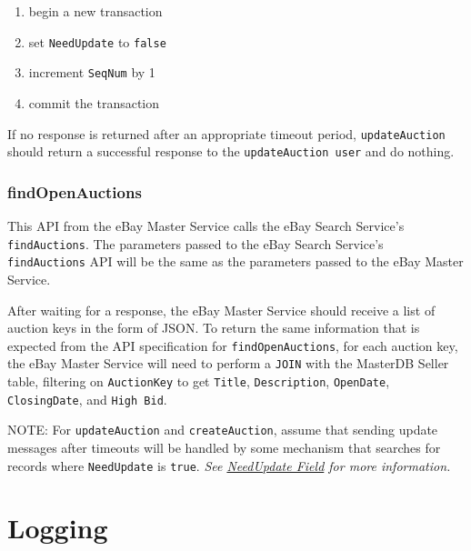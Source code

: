 \documentclass[12pt,a4paper]{article}
\begin{document}
 \begin{enumerate}
     \item begin a new transaction
     \item set \texttt{NeedUpdate} to \texttt{false}
     \item increment \texttt{SeqNum} by 1
     \item commit the transaction
 \end{enumerate}


 If no response is returned after an appropriate timeout period, \texttt{updateAuction} 
 should return a successful response to the \texttt{updateAuction user} and do nothing.

 
\subsubsection{findOpenAuctions}
This API from the eBay Master Service calls the eBay Search Service's \texttt{findAuctions}.
The parameters passed to the eBay Search Service's \texttt{findAuctions} API will be the same
as the parameters passed to the eBay Master Service.
\vspace{\baselineskip}

After waiting for a response, the eBay Master Service should receive a list of auction keys 
in the form of JSON.  To return the same information that is expected from the API specification 
for \texttt{findOpenAuctions}, for each auction key, the eBay Master Service will need to perform a 
\texttt{JOIN} with the MasterDB Seller table, filtering on \texttt{AuctionKey} to get \texttt{Title}, 
\texttt{Description}, \texttt{OpenDate}, \texttt{ClosingDate}, and \texttt{High Bid}.

\vspace{\baselineskip}
\vspace{\baselineskip}
\vspace{\baselineskip}
\vspace{\baselineskip}
\vspace{\baselineskip}
\vspace{\baselineskip}

NOTE: For \texttt{updateAuction} and \texttt{createAuction}, assume that sending update messages after timeouts will be handled by some mechanism that
searches for records where \texttt{NeedUpdate} is \texttt{true}.
\emph{See \hyperref[sec:needupdate]{NeedUpdate Field} for more information.}

\pagebreak
\section{Logging}
\end{document}
